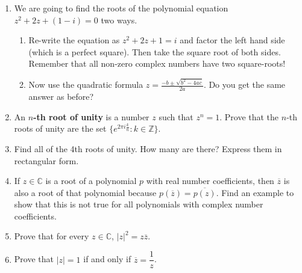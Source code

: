 \documentclass[11pt]{article}
\newcommand{\ds}{\displaystyle}
\newcommand{\C}{\mathbb{C}}
\newcommand{\Z}{\mathbb{Z}}
\begin{document}
\newpage
\begin{enumerate}
\setcounter{enumi}{\theenumCount}
\item We are going to find the roots of the polynomial equation $z^2 + 2z + (1-i) = 0$ two ways.
\begin{enumerate}
\item Re-write the equation as $z^2 + 2z + 1 = i$ and factor the left hand side (which is a perfect square). Then take the square root of both sides. Remember that all non-zero complex numbers have two square-roots!
\vfill

\item Now use the quadratic formula $\ds z = \frac{-b \pm \sqrt{b^2 - 4ac}}{2a}$.  Do you get the same answer as before? 
\vfill
\end{enumerate}

\item An \textbf{$n$-th root of unity} is a number $z$ such that $z^n = 1$.  Prove that the $n$-th roots of unity are the set $\{e^{2\pi i \frac{k}{n}} : k \in \Z\}$. 
\vfill

\item Find all of the 4th roots of unity. How many are there? Express them in rectangular form.  
\vfill

\item If $z \in \C$ is a root of a polynomial $p$ with real number coefficients, then $\overline{z}$ is also a root of that polynomial because $p(\overline{z}) = \overline{p(z)}$. Find an example to show that this is not true for all polynomials with complex number coefficients.
\vfill

\item Prove that for every $z \in \C$, $|z|^2 = z \overline{z}$.  
\vfill


\item Prove that $|z| = 1$ if and only if $\overline{z} = \dfrac{1}{z}$. %
\vfill





\setcounter{enumCount}{\theenumi}
\end{enumerate}
\end{document}

